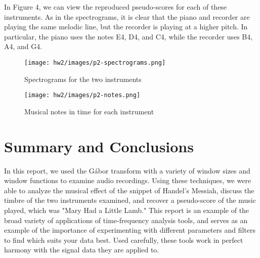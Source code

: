 \documentclass[a4paper,10 pt]{article}
\begin{document}
In Figure 4, we can view the reproduced pseudo-scores for each of these instruments. As in the spectrograms, it is clear that the piano and recorder are playing the same melodic line, but the recorder is playing at a higher pitch. In particular, the piano uses the notes E4, D4, and C4, while the recorder uses B4, A4, and G4.

\begin{figure}[H]
  \centering
    \texttt{[image: hw2/images/p2-spectrograms.png]}
    \label{fig:spec2}
    \caption{Spectrograms for the two instruments}
\end{figure}

\begin{figure}[H]
  \centering
    \texttt{[image: hw2/images/p2-notes.png]}
    \label{fig:notes}
    \caption{Musical notes in time for each instrument}
\end{figure}
\section{Summary and Conclusions}
In this report, we used the G\'abor transform with a variety of window sizes and window functions to examine audio recordings. Using these techniques, we were able to analyze the musical effect of the snippet of Handel's Messiah, discuss the timbre of the two instruments examined, and recover a pseudo-score of the music played, which was "Mary Had a Little Lamb." This report is an example of the broad variety of applications of time-frequency analysis tools, and serves as an example of the importance of experimenting with different parameters and filters to find which suits your data best. Used carefully, these tools work in perfect harmony with the signal data they are applied to.
\end{document}
